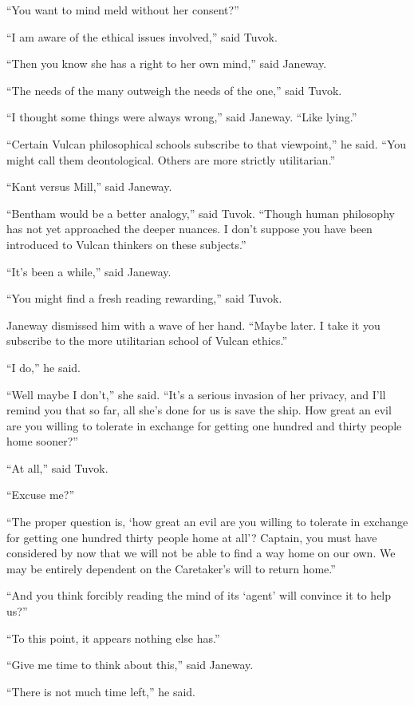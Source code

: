 \documentclass[twoside,letterpaper,12pt]{memoir}
\begin{document}
``You want to mind meld without her consent?'' 

``I am aware of the ethical issues involved,'' said Tuvok. 

``Then you know she has a right to her own mind,'' said Janeway. 

``The needs of the many outweigh the needs of the one,'' said Tuvok. 

``I thought some things were always wrong,'' said Janeway. ``Like lying.'' 

``Certain Vulcan philosophical schools subscribe to that viewpoint,'' he said. ``You might call them deontological. Others are more strictly utilitarian.'' 

``Kant versus Mill,'' said Janeway. 

``Bentham would be a better analogy,'' said Tuvok. ``Though human philosophy has not yet approached the deeper nuances. I don't suppose you have been introduced to Vulcan thinkers on these subjects.'' 

``It's been a while,'' said Janeway. 

``You might find a fresh reading rewarding,'' said Tuvok. 

Janeway dismissed him with a wave of her hand. ``Maybe later. I take it you subscribe to the more utilitarian school of Vulcan ethics.'' 

``I do,'' he said. 

``Well maybe I don't,'' she said. ``It's a serious invasion of her privacy, and I'll remind you that so far, all she's done for us is save the ship. How great an evil are you willing to tolerate in exchange for getting one hundred and thirty people home sooner?'' 

``At all,'' said Tuvok. 

``Excuse me?'' 

``The proper question is, `how great an evil are you willing to tolerate in exchange for getting one hundred thirty people home at all'? Captain, you must have considered by now that we will not be able to find a way home on our own. We may be entirely dependent on the Caretaker's will to return home.'' 

``And you think forcibly reading the mind of its `agent' will convince it to help us?'' 

``To this point, it appears nothing else has.'' 

``Give me time to think about this,'' said Janeway. 

``There is not much time left,'' he said. 
\end{document}
